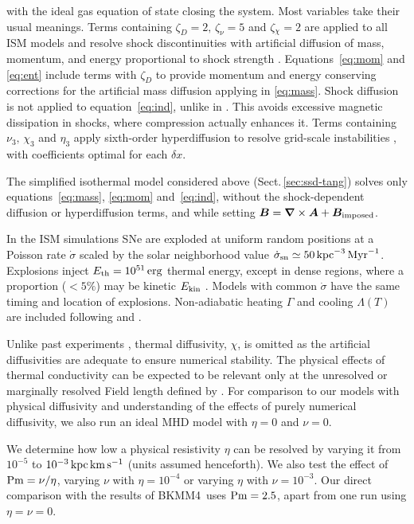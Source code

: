 \documentclass[iop,apj,numberedappendix,twocolappendix]{emulateapj}
\newcommand\ESK{E_{\rm kin}}
\newcommand\EST{E_{\rm th}}
\newcommand\Pm{{\rm Pm} }
\newcommand\BKM{{\sf BKMM4}}
\newcommand{\erg}{\,{\rm erg}}
\newcommand{\kms}{\,{\rm km\,s^{-1}}}
\newcommand{\kpc}{\,{\rm kpc}}
\newcommand{\Myr}{\,{\rm Myr}}
\newcommand{\vect}[1]{\boldsymbol{#1}}
\newcommand{\dx}{\delta x}
\newcommand\SNr{\dot\sigma_{\rm sn}}
\begin{document}
 with the ideal gas equation of state closing the system.
 Most variables take their usual meanings.
 Terms containing $\zeta_D{=2},\,\zeta_\nu{=5}$ and $\zeta{_\chi=2}$
 {are applied to all ISM models and} resolve shock discontinuities with
 artificial diffusion of mass, momentum, and energy proportional to shock
 strength \citep[see][for details]{GMKSH20}.
 Equations~\eqref{eq:mom} and \eqref{eq:ent} include terms with $\zeta_D$
 {to} {provide momentum and energy conserving corrections for} {the}
 {artificial mass diffusion applying in \eqref{eq:mass}.}
 Shock diffusion is not applied to equation~\eqref{eq:ind}{, unlike} {in}
 {\citet{Gent:2013b}.} {This avoids} {excessive magnetic dissipation in
 shocks, where compression actually enhances it.}
 Terms containing $\nu_3,\,\chi_3$ and $\eta_3$ apply sixth-order hyperdiffusion
 to resolve grid-scale instabilities \citep[see, e.g.,][]{ABGS02,HB04}, {
 with coefficients optimal for each $\dx$}.

 {The simplified isothermal model considered above
 (Sect.\,\ref{sec:ssd-tang}) solves only equations~{\eqref{eq:mass},}
 \eqref{eq:mom} and~\eqref{eq:ind}, without the shock-dependent diffusion or
 hyperdiffusion terms, and while setting
 $\vect{B}=\vect\nabla\times\vect{A}+\vect{B}_{\rm imposed}$.}

 {In the ISM simulations} SNe are exploded at {uniform} random positions
 at a Poisson rate $\dot\sigma$ {scaled by} the solar neighborhood
 value $\SNr\simeq 50\kpc^{-3}\Myr^{-1}$.
 Explosions inject $\EST = 10^{51}\erg$ thermal energy, except in
 dense regions, where a proportion {($<5\%$) may be} kinetic $\ESK$ 
 \citep[see][]{GMKSH20}.
 {Models with common $\dot\sigma$ have the same timing and location of
 explosions.}
 Non-adiabatic heating $\Gamma$ and cooling $\Lambda (T)$ are included
 \citep{Gent:2013b} following \citet{Wolfire:1995} and \citet{Sarazin:1987}.


 {Unlike past} experiments \citep{Gent:2013b,Gent:2013a,GMKSH20},
 thermal diffusivity, $\chi$, {is omitted as} the artificial diffusivities
 are adequate to ensure numerical stability.
 {The} physical effects of thermal conductivity can be expected to be
 relevant only at the unresolved or marginally resolved Field length defined
 by \citet[][named after George Field, not the magnetic field]{BM90}.
 {For comparison to our models with physical diffusivity and understanding
 of the effects of purely numerical diffusivity, we also run an ideal MHD model
 with} $\eta=0$ {and $\nu=0$.}

 We determine how low a physical resistivity $\eta$ can be resolved by varying
 it from $10^{-5}$ to $10^{-3}\kpc\kms$ (units assumed henceforth).
 {We also test the effect of $\Pm=\nu/\eta$, varying $\nu$ with 
 $\eta=10^{-4}$ or varying $\eta$ with $\nu=10^{-3}$.}
 {Our direct comparison with the results of \BKM\ uses $\Pm=2.5$, apart
 from one run using $\eta=\nu=0$.}
 
\end{document}
